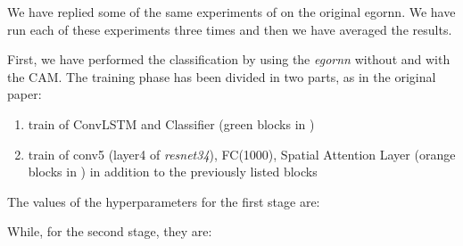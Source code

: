 \documentclass[10pt,twocolumn,hidelinks,letterpaper]{article}
\begin{document}
We have replied some of the same experiments of \cite{egornn} on the original egornn. We have run each of these experiments three times and then we have averaged the results.

First, we have performed the classification by using the \textit{egornn} without and with the CAM. The training phase has been divided in two parts, as in the original paper:

\begin{enumerate}
  \item train of ConvLSTM and Classifier (green blocks in )
  \item train of conv5 (layer4 of \textit{resnet34}), FC(1000), Spatial Attention Layer (orange blocks in ) in addition to the previously listed blocks
\end{enumerate}

The values of the hyperparameters for the first stage are:

\begin{center}
\end{center}

While, for the second stage, they are:

\begin{center}
\end{center}
\end{document}
